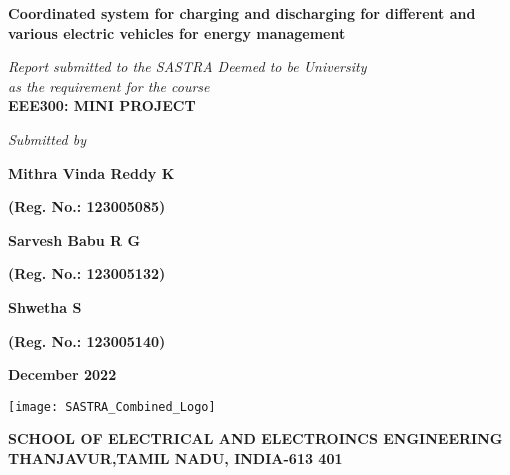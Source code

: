 \documentclass[a4paper, 12pt, oneside]{sastra}
\begin{document}
	\thispagestyle{empty}
	\begin{center}
		\Large{\textbf{Coordinated system for charging and discharging for different and various electric vehicles for energy management}}
	\end{center}
	\bigskip{}
	\bigskip{}
	\bigskip{}
	\begin{center}
		\textit{Report submitted to the SASTRA Deemed to be University\\ 
			as the requirement for the course\\
		}
		\bigskip{}
		\bigskip{}
		\large{\textbf{EEE300: MINI PROJECT}}
		\bigskip{}
		\bigskip{}
		\bigskip{}
		\bigskip{}
		\bigskip{}
		\bigskip{}
	\end{center}
	\begin{center}
		\textit{Submitted by}\\
	\end{center}
	\begin{center}
		\begin{singlespacing}
			\textbf{\Large{Mithra Vinda Reddy K}}
			
			\textbf{\large{(Reg. No.: 123005085)}}
			
			\textbf{\Large{Sarvesh Babu R G}}
			
			\textbf{\large{(Reg. No.: 123005132)}}
			
						\textbf{\Large{Shwetha S}}
			
			\textbf{\large{(Reg. No.: 123005140)}}
		\end{singlespacing}
	\end{center}
	\bigskip{}
	
	\begin{center}
		\Large{\textbf{December 2022}}   %
	\end{center}
	\bigskip{}
	\begin{center}
		\texttt{[image: SASTRA\_Combined\_Logo]}
	\end{center}
	
	\begin{center}
		\large{\textbf{SCHOOL OF ELECTRICAL AND ELECTROINCS ENGINEERING}} %
		{\textbf{THANJAVUR,TAMIL NADU, INDIA-613 401}}
	\end{center}
\newpage
	
	\setcounter{page}{2}
	
	\certificate
\end{document}
